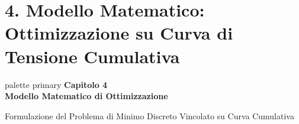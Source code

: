 \documentclass[aspectratio=169, 10pt]{beamer}
\begin{document}
\section{4. Modello Matematico: Ottimizzazione su Curva di Tensione Cumulativa}

\begin{frame}
    \vfill
    \centering
    \begin{beamercolorbox}[sep=10pt,center,shadow=true,rounded=true]{palette primary}
        {\Huge \textbf{Capitolo 4}}\\[0.3cm]
        {\LARGE \textbf{Modello Matematico di Ottimizzazione}}
    \end{beamercolorbox}
    \vspace{0.4cm}
    {\normalsize \textcolor{secondaryColor}{Formulazione del Problema di Minimo Discreto Vincolato su Curva Cumulativa}}
    \vfill
\end{frame}
\end{document}
